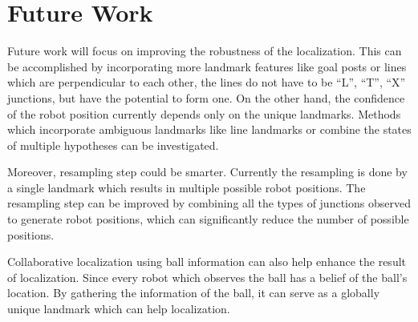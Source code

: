 \section{Future Work\label{sec:future}}
Future work will focus on improving the robustness of the localization. This can be accomplished by incorporating more landmark features like goal posts or lines which are perpendicular to each other, the lines do not have to be ``L'', ``T'', ``X'' junctions, but have the potential to form one. On the other hand, the confidence of the robot position currently depends only on the unique landmarks. Methods which incorporate ambiguous landmarks like line landmarks or combine the states of multiple hypotheses can be investigated.

Moreover, resampling step could be smarter. Currently the resampling is done by a single landmark which results in multiple possible robot positions. The resampling step can be improved by combining all the types of junctions observed to generate robot positions, which can significantly reduce the number of possible positions.


Collaborative localization using ball information can also help enhance the result of localization. Since every robot which observes the ball has a belief of the ball's location. By gathering the information of the ball, it can serve as a globally unique landmark which can help localization.


